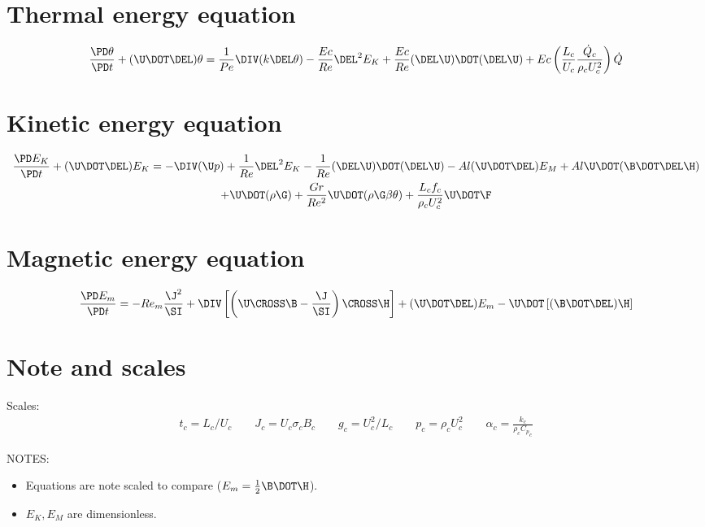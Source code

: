 \documentclass[landscape,11pt]{article}
\begin{document}
\doublespacing
\MOONSTITLE
\maketitle

\section{Thermal energy equation}
\begin{equation}
	\frac{\PD \theta}{\PD t}
	+ (\U \DOT \DEL) \theta
	= \frac{1}{Pe} \DIV (k \DEL \theta)
	- \frac{Ec}{Re} \DEL^2 E_K
	+ \frac{Ec}{Re} (\DEL \U) \DOT (\DEL \U)
	+ Ec \left( \frac{L_c}{U_c} \frac{\dot{Q}_c}{\rho_c U_c^2} \right) \dot{Q}
\end{equation}
\section{Kinetic energy equation}
\begin{multline}
	\frac{\PD E_K}{\PD t}
	+ (\U \DOT \DEL) E_K
	=
	- \DIV (\U p)
	+ \frac{1}{Re} \DEL^2 E_K
	- \frac{1}{Re} (\DEL \U) \DOT (\DEL \U)
	- Al (\U \DOT \DEL) E_M
	+ Al \U \DOT (\B \DOT \DEL \H) \\
	+ \U \DOT (\rho \G)
	+ \frac{Gr}{Re^2} \U \DOT (\rho \G \beta \theta)
	+ \frac{L_c f_c}{\rho_c U_c^2} \U \DOT \F
\end{multline}

\section{Magnetic energy equation}
\begin{equation}
	\frac{\PD E_m}{\PD t} =
	- Re_m \frac{{\J}^2}{\SI}
	+ \DIV \left[\left(\U \CROSS \B - \frac{\J}{\SI} \right) \CROSS \H \right]
	+ (\U \DOT \DEL) E_m
	- \U \DOT \left[(\B \DOT \DEL) \H \right]
\end{equation}


\section{Note and scales}
Scales:
\begin{equation}\begin{aligned}
	t_c = L_c/ U_c \qquad
	J_c = U_c \sigma_c B_c \qquad
	g_c = U_c^2/L_c \qquad
	p_c = \rho_c U_c^2 \qquad
	\alpha_c = \frac{k_c}{\rho_c {C_p}_c}
\end{aligned}\end{equation}

NOTES:
\begin{itemize}
	\item Equations are note scaled to compare ($E_m = \frac{1}{2} \B \DOT \H$).
	\item $E_K, E_M$ are dimensionless.
\end{itemize}
\end{document}
